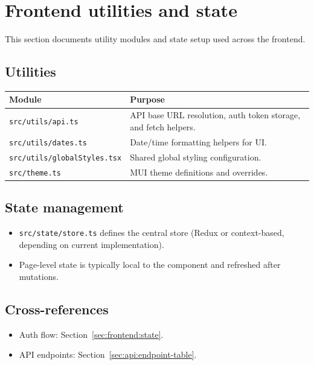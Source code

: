 \section{Frontend utilities and state}
\label{sec:frontend:utils}

This section documents utility modules and state setup used across the frontend.

\subsection{Utilities}
\label{subsec:frontend:utils:modules}

\begin{longtable}{p{}p{}}
\toprule
\textbf{Module} & \textbf{Purpose} \\
\midrule
\texttt{src/utils/api.ts} & API base URL resolution, auth token storage, and fetch helpers. \\
\texttt{src/utils/dates.ts} & Date/time formatting helpers for UI. \\
\texttt{src/utils/globalStyles.tsx} & Shared global styling configuration. \\
\texttt{src/theme.ts} & MUI theme definitions and overrides. \\
\bottomrule
\end{longtable}

\subsection{State management}
\label{subsec:frontend:utils:state}

\begin{itemize}
  \item \texttt{src/state/store.ts} defines the central store (Redux or context-based, depending on current implementation).
  \item Page-level state is typically local to the component and refreshed after mutations.
\end{itemize}

\subsection{Cross-references}
\label{subsec:frontend:utils:links}

\begin{itemize}
  \item Auth flow: Section~\ref{sec:frontend:state}.
  \item API endpoints: Section~\ref{sec:api:endpoint-table}.
\end{itemize}
